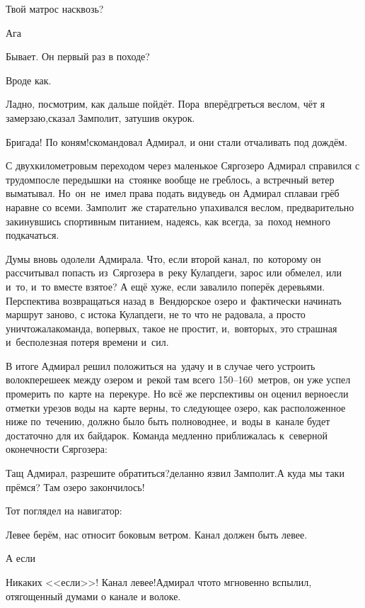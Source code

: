 \diagdash Твой матрос насквозь?

\diagdash Ага\myldots{}

\diagdash Бывает. Он первый раз в походе?

\diagdash Вроде как.

\diagdash Ладно, посмотрим, как дальше пойдёт. Пора~вперёд\mdash греться веслом, чёт я замерзаю,\mdash сказал Замполит, затушив окурок.

\diagdash Бригада! По коням!\mdash скомандовал Адмирал, и они стали отчаливать под дождём.

С двухкилометровым переходом через маленькое Сяргозеро Адмирал справился с трудом\mdash после передышки на~стоянке вообще не греблось, а встречный ветер выматывал. Но~он~не~имел права подать виду\mdash ведь он Адмирал сплава\mdash и грёб наравне со всеми. Замполит~же старательно упахивался веслом, предварительно закинувшись спортивным питанием, надеясь, как всегда, за~поход немного подкачаться. 

Думы вновь одолели Адмирала. Что, если второй канал, по~которому он рассчитывал попасть из~Сяргозера в~реку Кулапдеги, зарос или обмелел, или и~то, и~то вместе взятое? А ещё хуже, если завалило поперёк деревьями. Перспектива возвращаться назад в~Вендюрское озеро и~фактически начинать маршрут заново, с истока Кулапдеги, не то что не радовала, а просто уничтожала\mdash команда, во\sdash первых, такое не простит, и,~во\sdash вторых, это страшная и~бесполезная потеря времени и~сил. 

В итоге Адмирал решил положиться на~удачу и в случае чего устроить волок\mdash перешеек между озером и~рекой там всего 150\nobreakdash--160~метров, он уже успел промерить по~карте на~перекуре. Но всё же перспективы он оценил верно\mdash если отметки урезов воды на~карте верны, то следующее озеро, как расположенное ниже по~течению, должно было быть полноводнее, и~воды в~канале будет достаточно для их байдарок. Команда медленно приближалась к~северной оконечности Сяргозера:

\diagdash Тащ Адмирал, разрешите обратиться?\mdash деланно язвил Замполит.\mdash А куда мы таки прёмся? Там озеро закончилось!

Тот поглядел на навигатор:

\diagdash Левее берём, нас относит боковым ветром. Канал должен быть левее.

\diagdash А если\myldots{}

\diagdash Никаких <<если>>! Канал левее!\mdash Адмирал что\sdash то мгновенно вспылил, отягощенный думами о канале и волоке.

